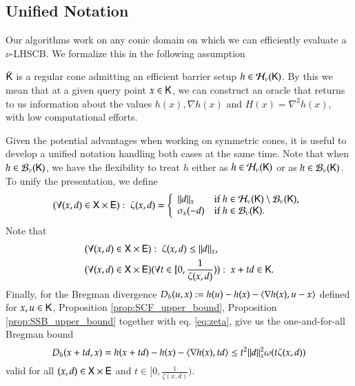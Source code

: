 \subsection{Unified Notation}
Our algorithms work on any conic domain on which we can efficiently evaluate a $\nu$-LHSCB. We formalize this in the following assumption
\begin{assumption}\label{ass:barrier}
$\bar{\mathsf{K}}$ is a regular cone admitting an efficient barrier setup $h\in\mathcal{H}_{\nu}(\mathsf{K})$. By this we mean that at a given query point $x\in\mathsf{K}$, we can construct an oracle that returns to us information about the values $h(x),\nabla h(x)$ and $H(x)=\nabla^{2}h(x)$, with low computational efforts. 
\end{assumption}
Given the potential advantages when working on symmetric cones, it is useful to develop a unified notation handling both cases at the same time. Note that when $h \in \mathcal{B}_{\nu}(\mathsf{K})$, we have the flexibility to treat $h$ either as $h \in\mathcal{H}_{\nu}(\mathsf{K})$ or as $h \in\mathcal{B}_{\nu}(\mathsf{K})$. To unify the presentation, we define
\begin{equation}\label{eq:zeta}
(\forall (x,d)\in\mathsf{X}\times \mathsf{E}):\;\zeta(x,d)=\left\{\begin{array}{ll} 
\lVert d\rVert_{x} & \text{if }h\in\mathcal{H}_{\nu}(\mathsf{K})\setminus\mathcal{B}_{\nu}(\mathsf{K}),\\
\sigma_{x}(-d) & \text{if }h\in\mathcal{B}_{\nu}(\mathsf{K}).
\end{array}
\right.  
\end{equation}
Note that
\begin{align}
&(\forall (x,d)\in\mathsf{X}\times \mathsf{E}):\; \zeta(x,d)\leq\lVert d\rVert_{x}, \label{eq:boundzeta}\\
&(\forall (x,d)\in\mathsf{X}\times \mathsf{E})(\forall t \in [0,\frac{1}{\zeta(x,d)})):\; x + td \in\mathsf{K} .\label{eq:step_length_zeta}
\end{align}
Finally, for the Bregman divergence $D_{h}(u,x):= h(u)-h(x)-\langle\nabla h(x),u-x\rangle$ defined for $x,u\in\mathsf{K}$, Proposition \ref{prop:SCF_upper_bound}, Proposition \ref{prop:SSB_upper_bound} together with eq. \eqref{eq:zeta}, give us the one-and-for-all Bregman bound
\begin{equation}\label{eq:Dbound}
D_{h}(x+t d,x)=h(x+t d)-h(x)-\langle\nabla h(x),td\rangle\leq  t^2 \lVert d\rVert_{x}^2 \omega(t \zeta(x,d))
\end{equation}
valid for all $(x,d)\in\mathsf{X}\times \mathsf{E}$ and $t \in [0,\frac{1}{\zeta(x,d)})$.

